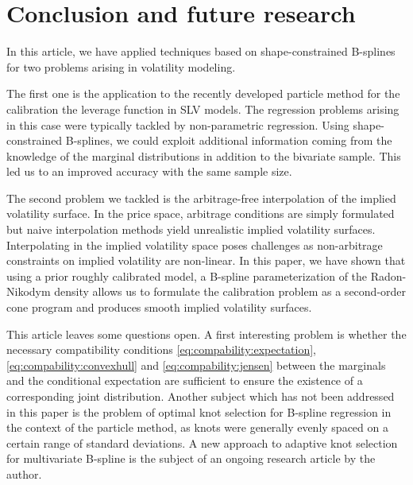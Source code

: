 \documentclass[a4paper]{article}
\newcommand{\1}{\textbf{1}}
\begin{document}
\section{Conclusion and future research}
\par In this article, we have applied techniques based on shape-constrained B-splines for two problems arising in volatility modeling.
\par The first one is the application to the recently developed particle method for the calibration the leverage function in SLV models. The regression problems arising in this case were typically tackled by non-parametric regression. Using shape-constrained B-splines, we could exploit additional information coming from the knowledge of the marginal distributions in addition to the bivariate sample. This led us to an improved accuracy with the same sample size.
\par The second problem we tackled is the arbitrage-free interpolation of the implied volatility surface. In the price space, arbitrage conditions are simply formulated but naive interpolation methods yield unrealistic implied volatility surfaces. Interpolating in the implied volatility space poses challenges as non-arbitrage constraints on implied volatility are non-linear. In this paper, we have shown that using a prior roughly calibrated model, a B-spline parameterization of the Radon-Nikodym density allows us to formulate the calibration problem as a second-order cone program and produces smooth implied volatility surfaces.
\par This article leaves some questions open. A first interesting problem is whether the necessary compatibility conditions \eqref{eq:compability:expectation}, \eqref{eq:compability:convexhull} and \eqref{eq:compability:jensen} between the marginals and the conditional expectation are sufficient to ensure the existence of a corresponding joint distribution. Another subject which has not been addressed in this paper is the problem of optimal knot selection for B-spline regression in the context of the particle method, as knots were generally evenly spaced on a certain range of standard deviations. A new approach to adaptive knot selection for multivariate B-spline is the subject of an ongoing research article by the author. 
\appendix
\end{document}
